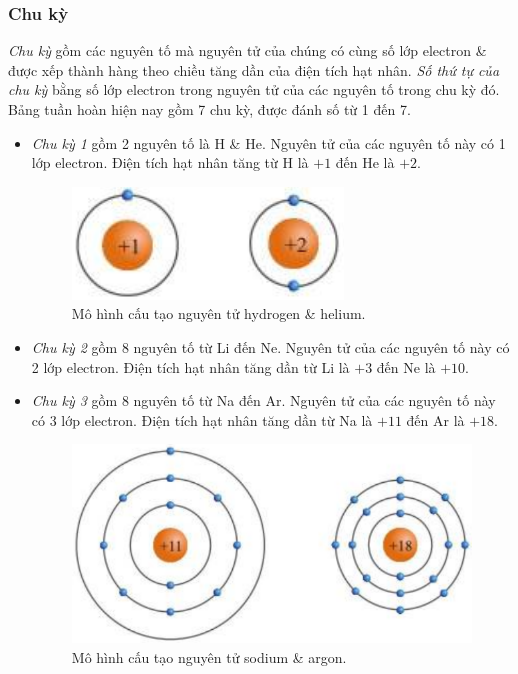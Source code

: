 \documentclass{article}
\begin{document}
\subsubsection{Chu kỳ}
\textit{Chu kỳ} gồm các nguyên tố mà nguyên tử của chúng có cùng số lớp electron \& được xếp thành hàng theo chiều tăng dần của điện tích hạt nhân. \textit{Số thứ tự của chu kỳ} bằng số lớp electron trong nguyên tử của các nguyên tố trong chu kỳ đó. Bảng tuần hoàn hiện nay gồm 7 chu kỳ, được đánh số từ 1 đến 7.
\begin{itemize}
	\item \textit{Chu kỳ 1} gồm 2 nguyên tố là H \& He. Nguyên tử của các nguyên tố này có 1 lớp electron. Điện tích hạt nhân tăng từ H là $+1$ đến He là $+2$.
	\begin{figure}[H]
		\centering
		\includegraphics[scale=0.3]{hydrogen_helium}
		\caption{Mô hình cấu tạo nguyên tử hydrogen \& helium.}
	\end{figure}
	\item \textit{Chu kỳ 2} gồm 8 nguyên tố từ Li đến Ne. Nguyên tử của các nguyên tố này có 2 lớp electron. Điện tích hạt nhân tăng dần từ Li là $+3$ đến Ne là $+10$.
	\item \textit{Chu kỳ 3} gồm 8 nguyên tố từ Na đến Ar. Nguyên tử của các nguyên tố này có 3 lớp electron. Điện tích hạt nhân tăng dần từ Na là $+11$ đến Ar là $+18$.
	\begin{figure}[H]
		\centering
		\includegraphics[scale=0.3]{sodium_argon}
		\caption{Mô hình cấu tạo nguyên tử sodium \& argon.}
	\end{figure}
\end{itemize}
\end{document}
